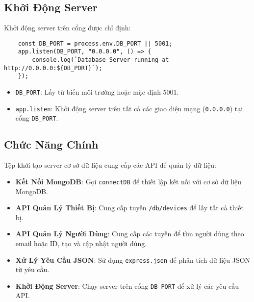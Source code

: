         \subsection{Khởi Động Server}
            \hspace*{0.6cm}Khởi động server trên cổng được chỉ định:
            \begin{lstlisting}
    const DB_PORT = process.env.DB_PORT || 5001;
    app.listen(DB_PORT, "0.0.0.0", () => {
        console.log(`Database Server running at http://0.0.0.0:${DB_PORT}`);
    });
            \end{lstlisting}
            \begin{itemize}
                \item \texttt{DB\_PORT}: Lấy từ biến môi trường hoặc mặc định 5001.
                \item \texttt{app.listen}: Khởi động server trên tất cả các giao diện mạng (\texttt{0.0.0.0}) tại cổng \texttt{DB\_PORT}.
            \end{itemize}

        \subsection{Chức Năng Chính}
            \hspace*{0.6cm}Tệp khởi tạo server cơ sở dữ liệu cung cấp các API để quản lý dữ liệu:
            \begin{itemize}
                \item \textbf{Kết Nối MongoDB}: Gọi \texttt{connectDB} để thiết lập kết nối với cơ sở dữ liệu MongoDB.
                \item \textbf{API Quản Lý Thiết Bị}: Cung cấp tuyến \texttt{/db/devices} để lấy tất cả thiết bị.
                \item \textbf{API Quản Lý Người Dùng}: Cung cấp các tuyến để tìm người dùng theo email hoặc ID, tạo và cập nhật người dùng.
                \item \textbf{Xử Lý Yêu Cầu JSON}: Sử dụng \texttt{express.json} để phân tích dữ liệu JSON từ yêu cầu.
                \item \textbf{Khởi Động Server}: Chạy server trên cổng \texttt{DB\_PORT} để xử lý các yêu cầu API.
            \end{itemize}


                    


